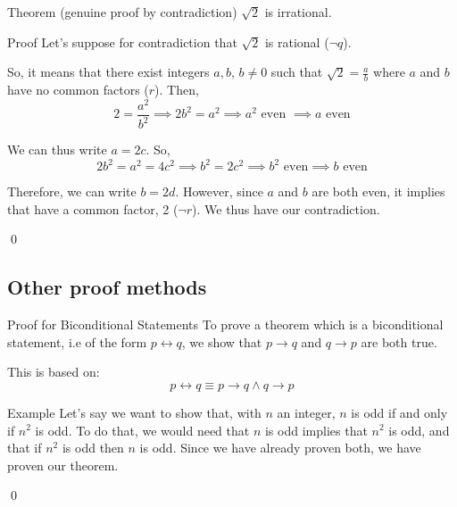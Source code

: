 \documentclass{article}
\begin{document}
\begin{parag}{Theorem (genuine proof by contradiction)}
    $\sqrt{2}$ is irrational.

    \begin{subparag}{Proof}
        Let's suppose for contradiction that $\sqrt{2}$ is rational ($\lnot q$).

        So, it means that there exist integers $a, b$, $b \neq 0$ such that $\sqrt{2} = \frac{a}{b}$ where $a$ and $b$ have no common factors ($r$). Then, 
        \[2 = \frac{a^2}{b^2} \implies 2b^2 = a^2 \implies a^2 \text{ even } \implies a \text{ even}\]

        We can thus write $a = 2c$. So, 
        \[2b^2 = a^2 = 4c^2 \implies b^2 = 2c^2 \implies b^2 \text{ even} \implies b \text{ even}\]
        
        Therefore, we can write $b = 2d$. However, since $a$ and $b$ are both even, it implies that have a common factor, 2 ($\lnot r$). We thus have our contradiction. 

        \qed
    \end{subparag}
\end{parag}

\subsection{Other proof methods}
\begin{parag}{Proof for Biconditional Statements}
    To prove a theorem which is a biconditional statement, i.e of the form $p \leftrightarrow q$, we show that $p \to q$ and $q \to p$ are both true.

    This is based on: 
    \[p \leftrightarrow q \equiv p\to q \land q \to p\]
    

    \begin{subparag}{Example}
        Let's say we want to show that, with $n$ an integer, $n$ is odd if and only if $n^2$ is odd. To do that, we would need that $n$ is odd implies that $n^2$ is odd, and that if $n^2$ is odd then $n$ is odd. Since we have already proven both, we have proven our theorem.

        \qed
    \end{subparag}
    
\end{parag}
\end{document}
